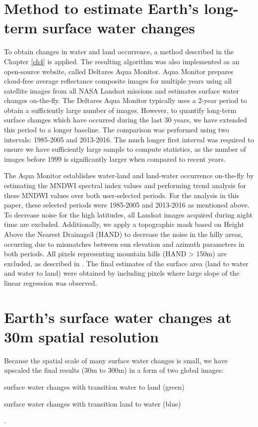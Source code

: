 \section{Method to estimate Earth's long-term surface water changes}
To obtain changes in water and land occurrence, a method described in the Chapter \ref{ch4} is applied. The resulting algorithm was also implemented as an open-source website, called Deltares Aqua Monitor. Aqua Monitor prepares cloud-free average reflectance composite images for multiple years using all satellite images from all NASA Landsat missions and estimates surface water changes on-the-fly. The Deltares Aqua Monitor typically uses a 2-year period to obtain a sufficiently large number of images. However, to quantify long-term surface changes which have occurred during the last 30 years, we have extended this period to a longer baseline. The comparison was performed using two intervals: 1985-2005 and 2013-2016. The much longer first interval was required to ensure we have sufficiently large sample to compute statistics, as the number of images before 1999 is significantly larger when compared to recent years.

The Aqua Monitor establishes water-land and land-water occurrence on-the-fly by estimating the MNDWI spectral index values and performing trend analysis for these MNDWI values over both user-selected periods. For the analysis in this paper, these selected periods were 1985-2005 and 2013-2016 as mentioned above. To decrease noise for the high latitudes, all Landsat images acquired during night time are excluded. Additionally, we apply a topographic mask based on Height Above the Nearest Drainage3 (HAND) to decrease the noise in the hilly areas, occurring due to mismatches between sun elevation and azimuth parameters in both periods. All pixels representing mountain hills (HAND > 150m) are excluded, as described in \cite{donchyts2016imdp}. The final estimates of the surface area (land to water and water to land) were obtained by including pixels where large slope of the linear regression was observed.  

\section{Earth's surface water changes at 30m spatial resolution}

Because the spatial scale of many surface water changes is small, we have upscaled the final results (30m to 300m) in a form of two global images: \begin{enumerate*}[label=(\emph{\alph*})]
	\item surface water changes with transition water to land (green)
	\item surface water changes with transition land to water (blue)
\end{enumerate*}.

